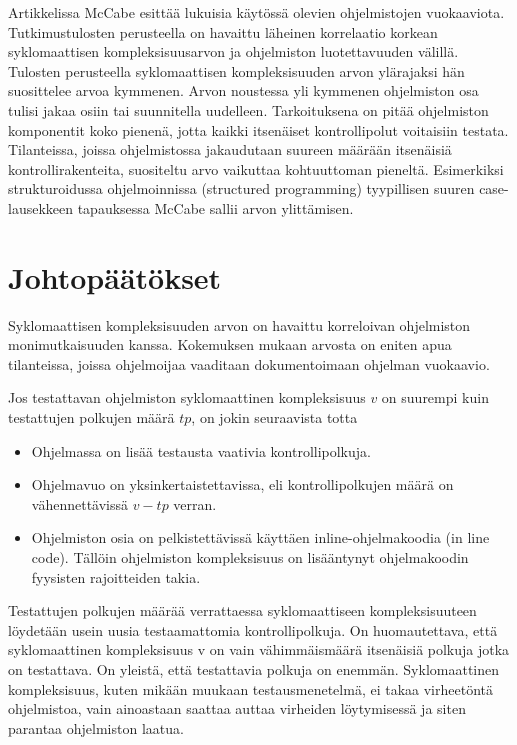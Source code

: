 \documentclass[finnish]{tktltiki2}
\theoremstyle{definition}
\theoremstyle{remark}
\begin{document}
Artikkelissa McCabe esittää lukuisia käytössä olevien ohjelmistojen vuokaaviota. Tutkimustulosten perusteella on havaittu läheinen korrelaatio korkean syklomaattisen kompleksisuusarvon ja ohjelmiston luotettavuuden välillä. Tulosten perusteella syklomaattisen kompleksisuuden arvon ylärajaksi hän suosittelee arvoa kymmenen. Arvon noustessa yli kymmenen ohjelmiston osa tulisi jakaa osiin tai suunnitella uudelleen. Tarkoituksena on pitää ohjelmiston komponentit koko pienenä, jotta kaikki itsenäiset kontrollipolut voitaisiin testata. Tilanteissa, joissa ohjelmistossa jakaudutaan suureen määrään itsenäisiä kontrollirakenteita, suositeltu arvo vaikuttaa kohtuuttoman pieneltä. Esimerkiksi strukturoidussa ohjelmoinnissa (structured programming) tyypillisen suuren case-lausekkeen tapauksessa McCabe sallii arvon ylittämisen.

\section{Johtopäätökset}

Syklomaattisen kompleksisuuden arvon on havaittu korreloivan ohjelmiston monimutkaisuuden kanssa. Kokemuksen mukaan arvosta on eniten apua tilanteissa, joissa ohjelmoijaa vaaditaan dokumentoimaan ohjelman vuokaavio.

Jos testattavan ohjelmiston syklomaattinen kompleksisuus $v$ on suurempi kuin testattujen polkujen määrä $tp$, on jokin seuraavista totta
\begin{itemize}
  \item Ohjelmassa on lisää testausta vaativia kontrollipolkuja.
  \item Ohjelmavuo on yksinkertaistettavissa, eli kontrollipolkujen määrä on vähennettävissä $v-tp$ verran.
  \item Ohjelmiston osia on pelkistettävissä käyttäen inline-ohjelmakoodia (in line code). Tällöin ohjelmiston kompleksisuus on lisääntynyt ohjelmakoodin fyysisten rajoitteiden takia.
\end{itemize}

Testattujen polkujen määrää verrattaessa syklomaattiseen kompleksisuuteen löydetään usein uusia testaamattomia kontrollipolkuja. On huomautettava, että syklomaattinen kompleksisuus v on vain vähimmäismäärä itsenäisiä polkuja jotka on testattava. On yleistä, että testattavia polkuja on enemmän. Syklomaattinen kompleksisuus, kuten mikään muukaan testausmenetelmä, ei takaa virheetöntä ohjelmistoa, vain ainoastaan saattaa auttaa virheiden löytymisessä ja siten parantaa ohjelmiston laatua.


%
%
% 
%






%
\end{document}
